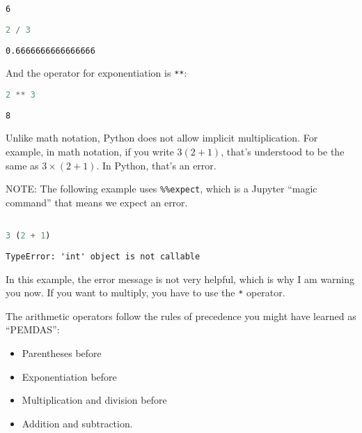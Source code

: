 \begin{lstlisting}[style=output]
6
\end{lstlisting}

\begin{lstlisting}[language=Python,style=source]
2 / 3
\end{lstlisting}

\begin{lstlisting}[style=output]
0.6666666666666666
\end{lstlisting}

And the operator for exponentiation is \passthrough{\lstinline!**!}:

\begin{lstlisting}[language=Python,style=source]
2 ** 3
\end{lstlisting}

\begin{lstlisting}[style=output]
8
\end{lstlisting}

Unlike math notation, Python does not allow implicit multiplication. For
example, in math notation, if you write \(3 (2 + 1)\), that's understood
to be the same as \(3 \times (2+ 1)\). In Python, that's an error.

\pagebreak

NOTE: The following example uses \passthrough{\lstinline!\%\%expect!},
which is a Jupyter ``magic command'' that means we expect an error.

\begin{lstlisting}[language=Python,style=source]
%%expect TypeError

3 (2 + 1)
\end{lstlisting}

\begin{lstlisting}[style=output]
TypeError: 'int' object is not callable
\end{lstlisting}

In this example, the error message is not very helpful, which is why I
am warning you now. If you want to multiply, you have to use the
\passthrough{\lstinline!*!} operator.

The arithmetic operators follow the rules of precedence you might have
learned as ``PEMDAS'':

\begin{itemize}

\item
  Parentheses before
\item
  Exponentiation before
\item
  Multiplication and division before
\item
  Addition and subtraction.
\end{itemize}


